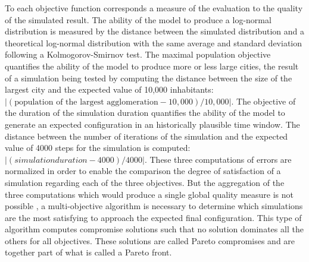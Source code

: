 \documentclass[10pt]{article}
\begin{document}
To each objective function corresponds a measure of the evaluation to the quality of the simulated result. The ability of the model to produce a log-normal distribution is measured by the distance between the simulated distribution and a theoretical log-normal distribution with the same average and standard deviation following a Kolmogorov-Smirnov test. The maximal population objective quantifies the ability of the model to produce more or less large cities, the result of a simulation being tested by computing the distance between the size of the largest city and the expected value of 10,000 inhabitants: $\left|(\textrm{population of the largest agglomeration} - 10,000) / 10,000 \right|$. The objective of the duration of the simulation duration quantifies the ability of the model to generate an expected configuration in an historically plausible time window. The distance between the number of iterations of the simulation and the expected value of 4000 steps for the simulation is computed: $\left| (simulation duration - 4000) / 4000 \right|$. These three computations of errors are normalized in order to enable the comparison the degree of satisfaction of a simulation regarding each of the three objectives. But the aggregation of the three computations which would produce a single global quality measure is not possible , a multi-objective algorithm is necessary to determine which simulations are the most satisfying to approach the expected final configuration. This type of algorithm computes compromise solutions such that no solution dominates all the others for all objectives. These solutions are called Pareto compromises and are together part of what is called a Pareto front.
\end{document}
